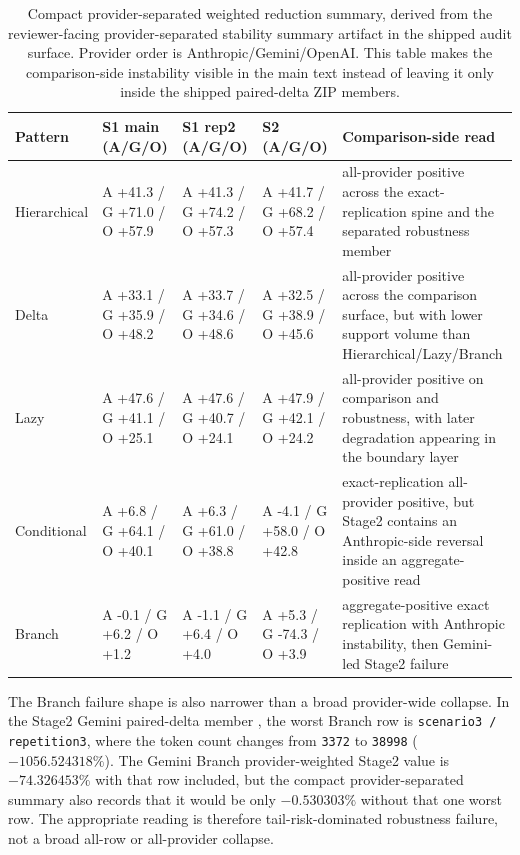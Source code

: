 \documentclass[11pt,a4paper]{article}
\begin{document}
\begin{table}[t]
\centering
\small
\begin{tabular}{L{1.85cm}L{2.7cm}L{2.7cm}L{2.7cm}L{3.75cm}}
\toprule
\textbf{Pattern} & \textbf{S1 main (A/G/O)} & \textbf{S1 rep2 (A/G/O)} & \textbf{S2 (A/G/O)} & \textbf{Comparison-side read} \\
\midrule
Hierarchical & A +41.3 / G +71.0 / O +57.9 & A +41.3 / G +74.2 / O +57.3 & A +41.7 / G +68.2 / O +57.4 & all-provider positive across the exact-replication spine and the separated robustness member \\
Delta & A +33.1 / G +35.9 / O +48.2 & A +33.7 / G +34.6 / O +48.6 & A +32.5 / G +38.9 / O +45.6 & all-provider positive across the comparison surface, but with lower support volume than Hierarchical/Lazy/Branch \\
Lazy & A +47.6 / G +41.1 / O +25.1 & A +47.6 / G +40.7 / O +24.1 & A +47.9 / G +42.1 / O +24.2 & all-provider positive on comparison and robustness, with later degradation appearing in the boundary layer \\
Conditional & A +6.8 / G +64.1 / O +40.1 & A +6.3 / G +61.0 / O +38.8 & A -4.1 / G +58.0 / O +42.8 & exact-replication all-provider positive, but Stage2 contains an Anthropic-side reversal inside an aggregate-positive read \\
Branch & A -0.1 / G +6.2 / O +1.2 & A -1.1 / G +6.4 / O +4.0 & A +5.3 / G -74.3 / O +3.9 & aggregate-positive exact replication with Anthropic instability, then Gemini-led Stage2 failure \\
\bottomrule
\end{tabular}
\caption{Compact provider-separated weighted reduction summary, derived from the reviewer-facing provider-separated stability summary artifact in the shipped audit surface. Provider order is Anthropic/Gemini/OpenAI. This table makes the comparison-side instability visible in the main text instead of leaving it only inside the shipped paired-delta ZIP members.}
\label{tab:provider_separated_stability}
\end{table}

The Branch failure shape is also narrower than a broad provider-wide collapse. In the Stage2 Gemini paired-delta member , the worst Branch row is \texttt{scenario3 / repetition3}, where the token count changes from \texttt{3372} to \texttt{38998} (\(-1056.524318\%\)). The Gemini Branch provider-weighted Stage2 value is \(-74.326453\%\) with that row included, but the compact provider-separated summary also records that it would be only \(-0.530303\%\) without that one worst row. The appropriate reading is therefore tail-risk-dominated robustness failure, not a broad all-row or all-provider collapse.
\end{document}
